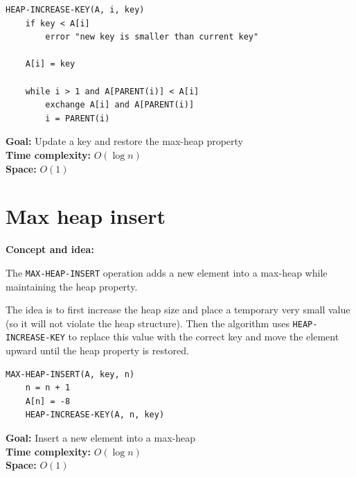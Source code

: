 \documentclass[11pt,a4paper,openany]{book}
\begin{document}
\begin{lstlisting}
HEAP-INCREASE-KEY(A, i, key)
    if key < A[i]
        error "new key is smaller than current key"

    A[i] = key

    while i > 1 and A[PARENT(i)] < A[i]
        exchange A[i] and A[PARENT(i)]
        i = PARENT(i)
\end{lstlisting}

\textbf{Goal:} Update a key and restore the max-heap property \\
\textbf{Time complexity:} $O(\log n)$ \\

\textbf{Space:} $O(1)$










\vspace{2cm}










\section{Max heap insert}



\textbf{Concept and idea:}

The \texttt{MAX-HEAP-INSERT} operation adds a new element into a max-heap while maintaining the heap property.

The idea is to first increase the heap size and place a temporary very small value (so it will not violate the heap structure).  
Then the algorithm uses \texttt{HEAP-INCREASE-KEY} to replace this value with the correct key and move the element upward until the heap property is restored.

\begin{lstlisting}
MAX-HEAP-INSERT(A, key, n)
    n = n + 1
    A[n] = -8
    HEAP-INCREASE-KEY(A, n, key)
\end{lstlisting}

\textbf{Goal:} Insert a new element into a max-heap \\

\textbf{Time complexity:} $O(\log n)$ \\

\textbf{Space:} $O(1)$
\end{document}
